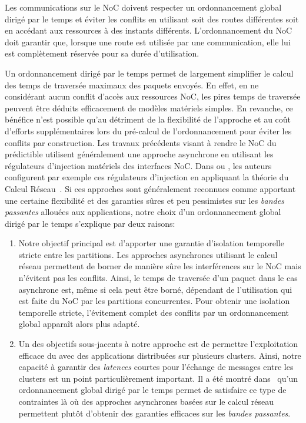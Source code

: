 \documentclass[main.tex]{subfiles}
\begin{document}
\begin{regleem}
    \label{em_resumeFr_regle2}
    Les communications sur le NoC doivent respecter un ordonnancement global dirigé par le temps et éviter les conflits en utilisant soit des routes différentes soit en accédant aux ressources à des instants différents. L'ordonnancement du NoC doit garantir que, lorsque une route est utilisée par une communication, elle lui est complètement réservée pour sa durée d'utilisation.
\end{regleem}

Un ordonnancement dirigé par le temps permet de largement simplifier le calcul des temps de traversée maximaux des paquets envoyés. En effet, en ne considérant aucun conflit d'accès aux ressources NoC, les pires temps de traversée peuvent être déduits efficacement de modèles matériels simples. En revanche, ce bénéfice n'est possible qu'au détriment de la flexibilité de l'approche et au coût d'efforts supplémentaires lors du pré-calcul de l'ordonnancement pour éviter les conflits par construction. Les travaux précédents visant à rendre le NoC du \mppalong prédictible utilisent généralement une approche asynchrone en utilisant les régulateurs d'injection matériels des interfaces NoC. Dans \cite{Dinechin2014} ou \cite{Giannopoulou2015}, les auteurs configurent par exemple ces régulateurs d'injection en appliquant la théorie du Calcul Réseau~\cite{LeBoudec2001, Cruz91}. Si ces approches sont généralement reconnues comme apportant une certaine flexibilité et des garanties sûres et peu pessimistes sur les \emph{bandes passantes} allouées aux applications, notre choix d'un ordonnancement global dirigé par le temps s'explique par deux raisons:
\begin{enumerate}
    \item Notre objectif principal est d'apporter une garantie d'isolation temporelle stricte entre les partitions. Les approches asynchrones utilisant le calcul réseau permettent de borner de manière sûre les interférences sur le NoC mais n'évitent pas les conflits. Ainsi, le temps de traversée d'un paquet dans le cas asynchrone est, même si cela peut être borné, dépendant de l'utilisation qui est faite du NoC par les partitions concurrentes. Pour obtenir une isolation temporelle stricte, l'évitement complet des conflits par un ordonnancement global apparaît alors plus adapté.
    \item Un des objectifs sous-jacents à notre approche est de permettre l'exploitation efficace du \mppalong avec des applications distribuées sur plusieurs clusters. Ainsi, notre capacité à garantir des \emph{latences} courtes pour l'échange de messages entre les clusters est un point particulièrement important. Il a été montré dans~\cite{Puffitsch2015} qu'un ordonnancement global dirigé par le temps permet de satisfaire ce type de contraintes là où des approches asynchrones basées sur le calcul réseau permettent plutôt d'obtenir des garanties efficaces sur les \emph{bandes passantes}.
\end{enumerate}
\end{document}
